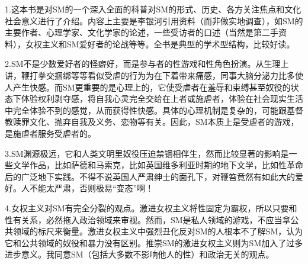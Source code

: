 1.这本书是对SM的一个深入全面的科普对SM的形式、历史、各方关注焦点和文化社会意义进行了介绍。内容上主要是李银河引用资料（而非做实地调查），如SM的主要作者、心理学家、文化学家的论述，一些受访者的口述（当然是第二手资料），女权主义和SM爱好者的论战等等。全书是典型的学术型结构，比较好读。

2.SM不是少数爱好者的怪癖好，而是参与者的性游戏和性角色扮演。从生理上讲，鞭打拳交捆绑等等看似受虐的行为为在下着带来痛感，同事大脑分泌力比多使人产生快感。而SM更重要的是心理上的，它使受虐者在羞辱和束缚甚至奴役的状态下体验权利剥夺感，将自我心灵完全交给在上者或施虐者，体验在社会现实生活中完全体验不到的感觉，从而获得性快感。具体的心理机制是复杂的，可能跟基督教赎罪文化、抛弃自我及义务、恋物等有关。因此，SM本质上是受虐者的游戏，是施虐者服务受虐者的。

3.SM渊源极远，它和人类文明里奴役压迫禁锢相伴生，然而比较显著的影响是一些文学作品，比如萨德和马索克，比如英国维多利亚时期的地下文学，比如性革命后的广泛地下实践。不得不说英国人严肃绅士的面孔下，对鞭笞竟然有如此大的爱好。人不能太严肃，否则极易“变态”啊！

4.女权主义对SM有完全分裂的观点。激进女权主义将性固定为霸权，所以只要和性有关系，必然拖入政治领域来审视。然而，SM是私人领域的游戏，不应当拿公共领域的标尺来衡量。激进女权主义中强烈丑化反对SM的人根本不了解SM，认为它和公共领域的奴役和暴力没有区别。推崇SM的激进女权主义则为SM加入了过多进步意义。我同意SM（包括大多数不影响他人的性）和政治无关的观点。